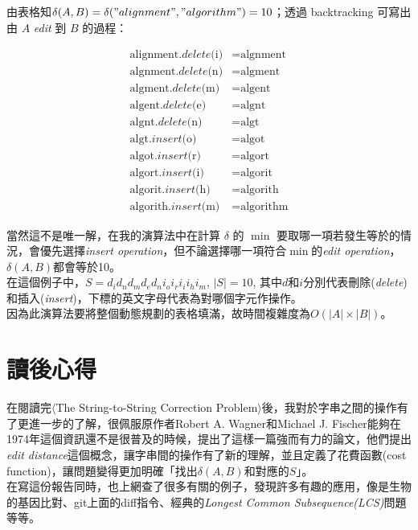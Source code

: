 \documentclass[15pt]{extarticle}
\begin{document}
由表格知$\delta(A, B) = \delta("alignment", "algorithm") = 10$；透過 backtracking 可寫出由 $A$ \textit{edit} 到 $B$ 的過程：

\begin{align}
\text{alignment.$delete$(i)} &= \text{algnment}  \\
\text{algnment.$delete$(n)} &= \text{algment}  \\
\text{algment.$delete$(m)} &= \text{algent}  \\
\text{algent.$delete$(e)} &= \text{algnt}  \\
\text{algnt.$delete$(n)} &= \text{algt}  \\
\text{algt.$insert$(o)} &= \text{algot}  \\
\text{algot.$insert$(r)} &= \text{algort}  \\
\text{algort.$insert$(i)} &= \text{algorit}  \\
\text{algorit.$insert$(h)} &= \text{algorith}  \\
\text{algorith.$insert$(m)} &= \text{algorithm}  
\end{align}

當然這不是唯一解，在我的演算法中在計算 $\delta$ 的 $\min$ 要取哪一項若發生等於的情況，會優先選擇\textit{insert operation}，但不論選擇哪一項符合$\min$的\textit{edit operation}，$\delta(A,B)$都會等於10。\\

在這個例子中，$S=d_id_nd_md_ed_ni_oi_ri_ii_hi_m$, $|S|=10$, 其中$d$和$i$分別代表刪除(\textit{delete})和插入(\textit{insert})，下標的英文字母代表為對哪個字元作操作。\\

因為此演算法要將整個動態規劃的表格填滿，故時間複雜度為$O(|A|\times|B|)$。

\section{讀後心得}

在閱讀完$\langle$The String-to-String Correction Problem$\rangle$後，我對於字串之間的操作有了更進一步的了解，很佩服原作者Robert A. Wagner和Michael J. Fischer能夠在1974年這個資訊還不是很普及的時候，提出了這樣一篇強而有力的論文，他們提出\textit{edit distance}這個概念，讓字串間的操作有了新的理解，並且定義了花費函數(cost function)，讓問題變得更加明確「找出$\delta(A,B)$和對應的$S$」。\\

在寫這份報告同時，也上網查了很多有關的例子，發現許多有趣的應用，像是生物的基因比對、git上面的diff指令、經典的\textit{Longest Common Subsequence(LCS)}問題等等。\\
\end{document}

